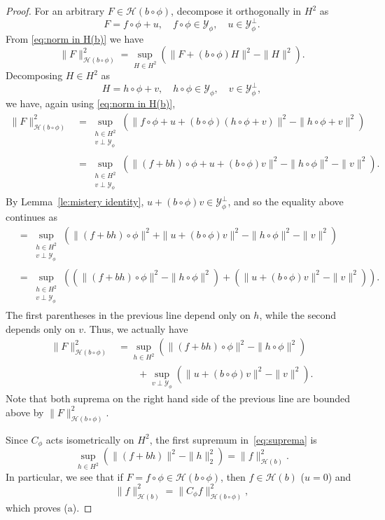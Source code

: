 \documentclass[10pt,a4paper]{amsart}
\def\HH{{\mathcal H}}
\def\YY{{\mathcal Y}}
\begin{document}
\begin{proof}
For an arbitrary $F\in \HH(b\circ\phi)$, decompose it orthogonally in $H^2$ as 
$$F=f\circ \phi+u, \quad f\circ \phi\in \YY_\phi, \quad u\in\YY_\phi^\perp.$$ From \eqref{eq:norm in H(b)} we have
	\[
		\|F\|^2_{\mathcal{H}(b \circ \phi)}=\sup_{H\in H^2}\left( \|F+(b\circ \phi) H\|^2-\|H\|^2\right).
	\]
	Decomposing $H \in H^2$ as 
    $$H=h\circ \phi+v, \quad h\circ \phi\in \YY_\phi, \quad v\in\YY_\phi^\perp,$$ we have, again using \eqref{eq:norm in H(b)},
	\[
	\begin{split}
		\|F\|^2_{\mathcal{H}(b \circ \phi)}&= \sup_{\substack{h \in H^2 \\ v \perp \YY_{\phi}}} \left(\| f\circ\phi+u+(b\circ\phi)(h\circ \phi+v)\|^2-\|h\circ\phi+v\|^2\right)\\
		&=\sup_{\substack{h \in H^2 \\ v \perp \YY_{\phi}}} \left(\| (f+bh)\circ\phi+u+(b\circ\phi)v\|^2-\|h\circ\phi\|^2-\|v\|^2\right).
	\end{split}
	\]
	By Lemma~\ref{le:mistery identity}, $u+(b\circ \phi)v\in \YY_\phi^\perp$, and so the equality above continues as 
\begin{align*}
& = \sup_{\substack{h \in H^2 \\ v \perp \YY_{\phi}}} \left(\| (f+bh)\circ\phi\|^2+\|u+(b\circ\phi)v\|^2-\|h\circ\phi\|^2-\|v\|^2\right)\\
	&=\sup_{\substack{h \in H^2 \\ v \perp \YY_{\phi}}} \left(\left(\| (f+bh)\circ\phi\|^2-\|h\circ\phi\|^2\right) + \left(\| u+(b\circ \phi)v\|^2-\|v\|^2\right)\right).
\end{align*}
	The first parentheses in the previous line depend only on $ h $, while the second depends only on $ v $. Thus,  we actually have
		\begin{align}\label{eq:suprema}
			\|F\|^2_{\mathcal{H}(b \circ \phi)} & =
		\sup_{h\in H^2} \left(\| (f+bh)\circ\phi\|^2-\|h\circ\phi\|^2\right)\\
		& \quad \quad  +\sup_{v\perp\YY_\phi} \left(\| u+(b\circ \phi)v\|^2-\|v\|^2\right).\nonumber
		\end{align}
Note that both suprema on the right hand side of the previous line are bounded above by $\|F\|^2_{\mathcal{H}(b \circ \phi)}$.


	Since $C_\phi$ acts isometrically on $H^2$, the first supremum in~\eqref{eq:suprema} is
	\begin{equation}\label{eq:first supremum}
			\sup_{h\in H^2} \left(\| (f+bh) \|^2-\|h \|^2_2\right)=\|f\|^2_{\HH(b)}.
	\end{equation}
	In particular, we see that if  $F =   f\circ\phi \in \HH(b\circ\phi) $, then $f \in \HH(b)$ ($u = 0$) and
	\[
	\|f\|^2_{\HH(b)}=\|C_\phi f\|^2_{\HH(b\circ\phi)},
	\]
	which proves (a).
	

\end{proof}
\end{document}
